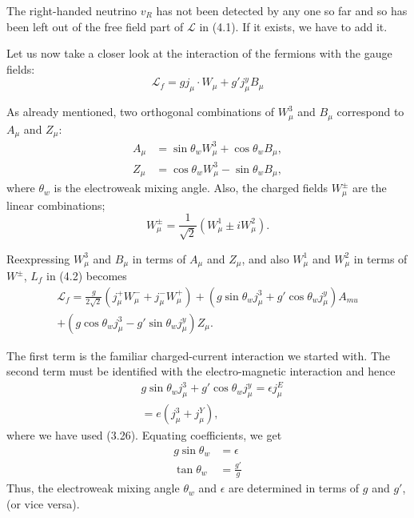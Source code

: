 The right-handed neutrino $v_{R}$ has not been detected by any one so far and so has been left out of the free field part of $\mathcal{L}$ in (4.1). If it exists, we have to add it. 

Let us now take a closer look at the interaction of the fermions with the gauge fields: 
\begin{equation*}
\mathcal{L}_{f}= g j_{\mu} \cdot W_{\mu} + g' j^{y}_{\mu} B_{\mu}\tag{4.2}
\end{equation*}   

As already mentioned, two orthogonal combinations of $W^{3}_{\mu}$ and $B_{\mu}$ correspond to $A_{\mu}$ and $Z_{\mu}$:
\begin{align*}
A_{\mu} &= \sin \theta_{w} W^{3}_{\mu} + \cos \theta_{w} B_{\mu},\tag{4.3}\\
Z_{\mu} &= \cos \theta_{w} W^{3}_{\mu} - \sin \theta_{w} B_{\mu},\tag{4.4}
\end{align*} 
where $\theta_{w}$ is the electroweak mixing angle. Also, the charged fields $W^{\pm}_{\mu}$ are the linear combinations; 
\begin{equation*}
W^{\pm}_{\mu} = \frac{1}{\sqrt{2}} (W^{1}_{\mu} \pm i W^{2}_{\mu}).\tag{4.5}
\end{equation*}

Reexpressing $W^{3}_{\mu}$ and $B_{\mu}$ in terms of $A_{\mu}$ and $Z_{\mu}$, and also $W^{1}_{\mu}$ and $W^{2}_{\mu}$ in terms of $W^{\pm}$, $L_{f}$ in (4.2)
becomes 
\begin{align*}
\mathcal{L}_{f} = \frac{g}{2\sqrt{2}} (j^{+}_{\mu}W^{-}_{\mu} +j^{-}_{\mu}W^{+}_{\mu}) + (g \sin \theta_{w} j^{3}_{\mu} + g' \cos \theta_{w} j^{y}_{\mu})A_{mu}\tag{4.6}\\
+ (g \cos \theta_{w} j^{3}_{\mu} -g' \sin \theta_{w} j^{y}_{\mu})Z_{\mu}.
\end{align*}

The first term is the familiar charged-current interaction we started with. The second term must
be identified with the electro-magnetic interaction and hence 
\begin{align*}
& g \sin \theta_{w} j^{3}_{\mu} + g' \cos \theta_{w} j^{y}_{\mu} = \epsilon j^{E}_{\mu}\\
& = e(j^{3}_{\mu} + j^{Y}_{\mu}),\tag{4.7}
\end{align*}
where we have used (3.26). Equating coefficients, we get 
\begin{align*}
g \sin \theta_{w} &= \epsilon\tag{4.8}\\
\tan \theta_{w} &=\frac{g'}{g}\tag{4.9}
\end{align*}
Thus, the electroweak mixing angle $\theta_{w}$ and $\epsilon$ are determined in terms of $g$ and $g'$, (or vice versa). 

